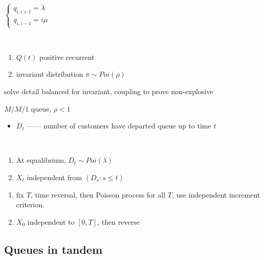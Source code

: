 \begin{setting}
    $\begin{cases}
         q_{i,i+1} = \lambda\\
         q_{i,i-1} = i\mu
    \end{cases}$
\end{setting}

\begin{thm}\,
    \begin{enumerate}
        \item $Q(t)$ positive recurrent
        \item invariant distribution $\pi \sim Poi(\rho)$
    \end{enumerate}
\end{thm}
\begin{pf}
    solve detail balanced for invariant, coupling to prove non-explosive
\end{pf}

\begin{setting}
    $M/M/1$ queue, $\rho < 1$
\end{setting}

\begin{itemize}
    \item $D_t$ ------ number of customers have departed queue up to time $t$
\end{itemize}

\begin{thm}\,
    \begin{enumerate}
        \item At equalibrium, $D_t \sim Poi(\lambda)$
        \item $X_t$ independent from $(D_s : s \leq t)$
    \end{enumerate}
\end{thm}
\begin{pf}
    \begin{enumerate}
        \item fix $T$, time reversal, then Poisson process for all $T$, use independent increment criterion.
        \item $X_0$ independent to $[0,T]$, then reverse
    \end{enumerate}
\end{pf}

\subsection{Queues in tandem}\label{subsec:queues-in-tandem}

